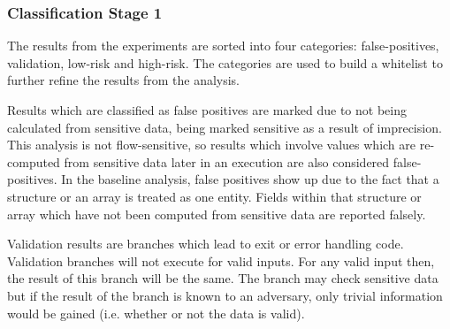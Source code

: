 \documentclass[11pt,a4paper]{article}
\begin{document}

\subsubsection{Classification Stage 1}
 The results from the experiments are sorted into four categories:
 false-positives, validation, low-risk and high-risk. The categories are used to
 build a whitelist to further refine the results from the analysis.

 Results which are classified as false positives are marked due to not being
 calculated from sensitive data, being marked sensitive as a result of
 imprecision. This analysis is not flow-sensitive, so results which involve
 values which are re-computed from sensitive data later in an execution are also
 considered false-positives. In the baseline analysis, false positives show up
 due to the fact that a structure or an array is treated as one entity. Fields
 within that structure or array which have not been computed from sensitive data
 are reported falsely.
 
 Validation results are branches which lead to exit or error handling code.
 Validation branches will not execute for valid inputs. For any valid input
 then, the result of this branch will be the same. The branch may check
 sensitive data but if the result of the branch is known to an adversary, only
 trivial information would be gained (i.e. whether or not the data is valid).
\end{document}
